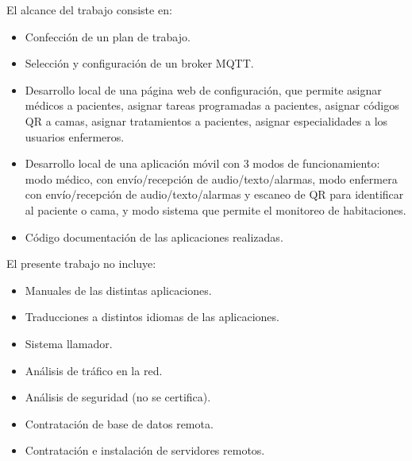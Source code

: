 \pagebreak
El alcance del trabajo consiste en:
\begin{itemize}
\item Confección de un plan de trabajo.
\item Selección y configuración de un broker MQTT.
\item Desarrollo local de una página web de configuración, que permite asignar médicos a pacientes, asignar tareas programadas a pacientes, asignar códigos QR a camas, asignar tratamientos a pacientes, asignar especialidades a los usuarios enfermeros.
\item Desarrollo local de una aplicación móvil con 3 modos de funcionamiento: modo médico, con envío/recepción de audio/texto/alarmas, modo enfermera con envío/recepción de audio/texto/alarmas y escaneo de QR para identificar al paciente o cama, y modo sistema que permite el monitoreo de habitaciones.
\item Código documentación de las aplicaciones realizadas.
\end{itemize}

El presente trabajo no incluye:
\begin{itemize}
\item Manuales de las distintas aplicaciones.
\item Traducciones a distintos idiomas de las aplicaciones.
\item Sistema llamador.
\item Análisis de tráfico en la red.
\item Análisis de seguridad (no se certifica).
\item Contratación de base de datos remota.
\item Contratación e instalación de servidores remotos.
\end{itemize}









